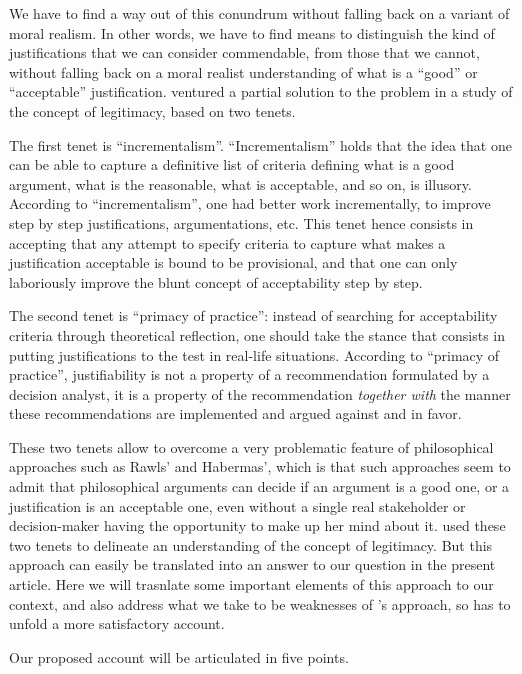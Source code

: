 \documentclass[preprint, french, english, 11pt, authoryear]{elsarticle}%
\begin{document}
We have to find a way out of this conundrum without falling back on a variant of moral realism. In other words, we have to find means to distinguish the kind of justifications that we can consider commendable, from those that we cannot, without falling back on a moral realist understanding of what is a ``good'' or ``acceptable'' justification. \cite{meinard_what_2017} ventured a partial solution to the problem in a study of the concept of legitimacy, based on two tenets.

The first tenet is ``incrementalism''. ``Incrementalism'' holds that the idea that one can be able to capture a definitive list of criteria defining what is a good argument, what is the reasonable, what is acceptable, and so on, is illusory. According to ``incrementalism'', one had better work incrementally, to improve step by step justifications, argumentations, etc. This tenet hence consists in accepting that any attempt to specify criteria to capture what makes a justification acceptable is bound to be provisional, and that one can only laboriously improve the blunt concept of acceptability step by step.

The second tenet is ``primacy of practice'': instead of searching for acceptability criteria through theoretical reflection, one should take the stance that consists in putting justifications to the test in real-life situations. According to ``primacy of practice'', justifiability is not a property of a recommendation formulated by a decision analyst, it is a property of the recommendation \emph{together with} the manner these recommendations are  implemented and argued against and in favor.

These two tenets allow to overcome a very problematic feature of philosophical approaches such as Rawls' and Habermas', which is that such approaches seem to admit that philosophical arguments can decide if an argument is a good one, or a justification is an acceptable one, even without a single real stakeholder or decision-maker having the opportunity to make up her mind about it.\cite{meinard_what_2017} used these two tenets to delineate an understanding of the concept of legitimacy. But this approach can easily be translated into an answer to our question in the present article. Here we will trasnlate some important elements of this approach to our context, and also address what we take to be weaknesses of \cite{meinard_what_2017}'s approach, so has to unfold a more satisfactory account.

Our proposed account will be articulated in five points.
\end{document}
